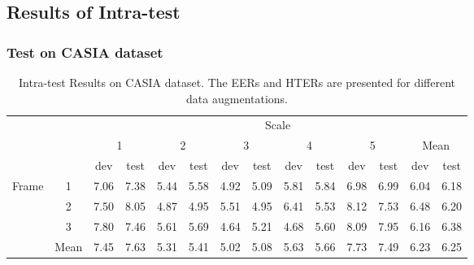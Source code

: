 \documentclass[letterpaper, 10 pt, conference]{ieeeconf}
\begin{document}
\subsection{Results of Intra-test}

\subsubsection{Test on CASIA dataset}

\begin{table*}[!htb]
\caption{Intra-test Results on CASIA dataset. The EERs and HTERs are presented for different data augmentations.}
\label{TB_CASIA_INTRA_OURS}
\center
\begin{tabular}{|c|c|c|c|c|c|c|c|c|c|c|c||c|c|}
\cline{3-14}
\multicolumn{2}{c|}{}       & \multicolumn{12}{c|}{Scale}     \\
\cline{3-14}
\multicolumn{2}{c|}{} & \multicolumn{2}{c|}{1} & \multicolumn{2}{c|}{2} & \multicolumn{2}{c|}{3} & \multicolumn{2}{c|}{4} & \multicolumn{2}{c|}{5} &  \multicolumn{2}{c|}{Mean}\\
\cline{3-14}
\multicolumn{2}{c|}{} & dev & test & dev & test & dev & test & dev & test & dev & test & dev & test \\
\hline
\multirow{3}{*}{Frame} & 1 & 7.06 & 7.38 & 5.44 & 5.58 & 4.92 & 5.09 & 5.81 & 5.84 & 6.98 & 6.99 & 6.04 & 6.18 \\ 

                       & 2 & 7.50 & 8.05 & 4.87 & 4.95 & 5.51 & 4.95 & 6.41 & 5.53 & 8.12 & 7.53 & 6.48 & 6.20 \\ 

                       & 3 & 7.80 & 7.46 & 5.61 & 5.69 & 4.64 & 5.21 & 4.68 & 5.60 & 8.09 & 7.95 & 6.16 & 6.38 \\ 
\hline
\hline
& Mean & 7.45 & 7.63 & 5.31 & 5.41 & 5.02 & 5.08 & 5.63 & 5.66 & 7.73 & 7.49 & 6.23 & 6.25\\
\hline
\end{tabular}
\end{table*}
\end{document}
